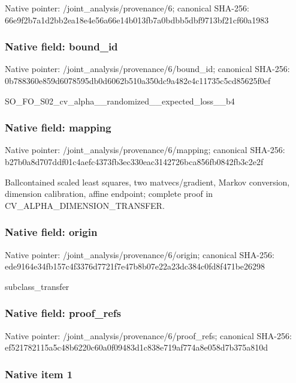 \documentclass[10pt,a4paper]{article}
\begin{document}
Native pointer: /joint\_analysis/provenance/6; canonical SHA-256: 66e9f2b7a1d2bb2ea18e4e56\allowbreak{}a66e14b013fb7a0bdbb5dbf9\allowbreak{}713bf21cf60a1983



\subsubsection{Native field: bound\_id}


Native pointer: /joint\_analysis/provenance/6/bound\_id; canonical SHA-256: 0b788360e859d6078595db0d\allowbreak{}6062b510a350dc9a482e4c11\allowbreak{}735c5cd85625f0ef


SO\_FO\_S02\_cv\_alpha\_\_rand\allowbreak{}omized\_\_expected\_loss\_\_b\allowbreak{}4


\subsubsection{Native field: mapping}


Native pointer: /joint\_analysis/provenance/6/mapping; canonical SHA-256: b27b0a8d707ddf01c4aefc43\allowbreak{}73fb3ec330eac3142726bca8\allowbreak{}56fb0842fb3c2e2f


Ballcontained scaled least squares, two matvecs/gradient, Markov conversion, dimension calibration, affine endpoint; complete proof in CV\_ALPHA\_DIMENSION\_TRANSFER.


\subsubsection{Native field: origin}


Native pointer: /joint\_analysis/provenance/6/origin; canonical SHA-256: ede9164e34fb157c4f3376d7\allowbreak{}721f7e47b8b07e22a23dc384\allowbreak{}c0fd8f471be26298


subclass\_transfer


\subsubsection{Native field: proof\_refs}


Native pointer: /joint\_analysis/provenance/6/proof\_refs; canonical SHA-256: ef521782115a5c48b6220c60\allowbreak{}a0f09483d1c838e719af774a\allowbreak{}8e058d7b375a810d



\subsubsection{Native item 1}
\end{document}
